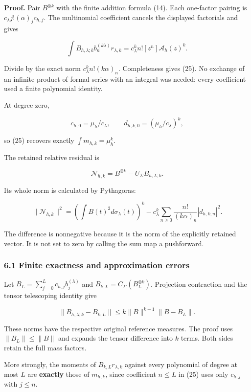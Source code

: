 \textbf{Proof.} Pair \(B^{\otimes k}\) with the finite addition formula (14). Each one-factor
pairing is \(c_\lambda j!(\alpha)_j c_{h,j}\). The multinomial coefficient cancels the displayed
factorials and gives

\[
\int B_{h,\lambda;k} b_n^{(k\lambda)}r_{\lambda,k}
=c_\lambda^k n! [z^n]\mathcal A_h(z)^k.
\]

Divide by the exact norm \(c_\lambda^k n!(k\alpha)_n\). Completeness gives (25). No exchange of an
infinite product of formal series with an integral was needed: every coefficient used a finite
polynomial identity.

At degree zero,

\[
c_{h,0}=\mu_h/c_\lambda,\qquad
 d_{h,k,0}=(\mu_h/c_\lambda)^k,
\]

so (25) recovers exactly \(\int m_{h,k}=\mu_h^k\).

The retained relative residual is

\[
\mathcal N_{h,k}=B^{\otimes k}-U_\Sigma B_{h,\lambda;k}.
\]

Its whole norm is calculated by Pythagoras:

\[
\boxed{
\|\mathcal N_{h,k}\|^2
=\left(\int B(t)^2d\sigma_\lambda(t)\right)^k
-c_\lambda^k\sum_{n\ge0}\frac{n!}{(k\alpha)_n}|d_{h,k,n}|^2.
}                                                                   \tag{26}
\]

The difference is nonnegative because it is the norm of the explicitly retained vector. It is not
set to zero by calling the sum map a pushforward.

\subsubsection{6.1 Finite exactness and approximation
errors}\label{gamma_convolution:finite-exactness-and-approximation-errors}

Let \(B_L=\sum_{j=0}^L c_{h,j}b_j^{(\lambda)}\) and \(B_{k,L}=C_\Sigma(B_L^{\otimes k})\).
Projection contraction and the tensor telescoping identity give

\[
\boxed{
\|B_{h,\lambda;k}-B_{k,L}\|
\le k\|B\|^{k-1}\|B-B_L\|.
}                                                                   \tag{27}
\]

These norms have the respective original reference measures. The proof uses \(\|B_L\|\le\|B\|\) and
expands the tensor difference into \(k\) terms. Both sides retain the full mass factors.

More strongly, the moments of \(B_{k,L}r_{\lambda,k}\) against every polynomial of degree at most
\(L\) are \textbf{exactly} those of \(m_{h,k}\), since coefficient \(n\le L\) in (25) uses only
\(c_{h,j}\) with \(j\le n\).

